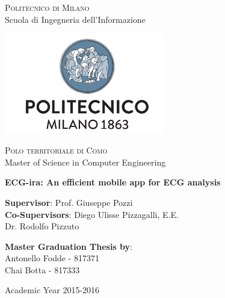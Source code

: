 \thispagestyle{empty}

\begin{center}

	\textsc{Politecnico di Milano}\\
 	Scuola di Ingegneria dell'Informazione\\  

 	\par\vskip 0.2cm

 	\includegraphics[width=7cm]{figures/polimi_logo.png}\\
  
 	\par\vskip 0.2cm  
  
  	\textsc{Polo territoriale di Como}\\
  	Master of Science in Computer Engineering\\  


  	\par\vskip 2cm
  	
\LARGE{ \bf	ECG-ira: An efficient mobile app for ECG analysis}


		
\end{center}

\par\vskip 1.5cm

\begin{flushleft}
  	\textbf{Supervisor}: Prof. Giuseppe Pozzi\\
  	\textbf{Co-Supervisors}: Diego Ulisse Pizzagalli, E.E.\\
  	\hspace{1in} Dr. Rodolfo Pizzuto \\
\end{flushleft}

\par\vskip 1cm

\begin{flushleft}
  	\textbf{Master Graduation Thesis by}: \\
  	Antonello Fodde - 817371 \\ 
  	Chai Botta - 817333 \\  
\end{flushleft}

\par\vskip 1cm

\begin{center}
 	Academic Year 2015-2016
\end{center}




